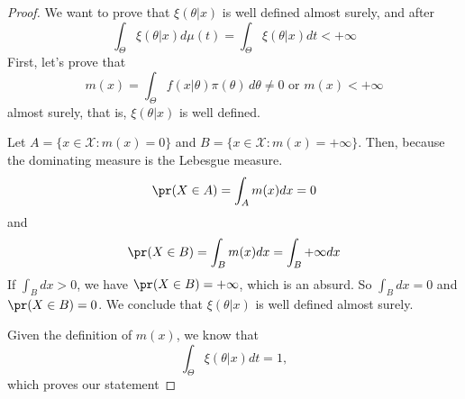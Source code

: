 \begin{proof}
    We want to prove that $\xi(\theta|x)$ is well defined almost
    surely, and after 
    $$
    \int_{\Theta } \xi(\theta|x) d\mu(t) = \int_{\Theta} \xi(\theta|x)dt < + \infty
    $$
    First, let's prove that 
    $$m(x) = \int_{\Theta} f(x|\theta)\pi(\theta) \, d\theta \neq 0 \text{ or } m(x) < + \infty$$ almost surely,
    that is, $\xi(\theta|x)$ is well defined. 
    
    Let $A = \{x \in \mathcal{X}: m(x) = 0\}$ and $B = \{x \in \mathcal{X}:
    m(x) = +\infty\}$. Then, because the dominating measure is the Lebesgue measure. 
    $$
    \pr(X \in A) = \int_A m(x) dx = 0
    $$
    and 
    $$
    \pr(X \in B) = \int_B m(x) dx = \int_B + \infty dx 
    $$
    If $\int_B dx > 0$, we have $\pr(X \in B) = + \infty$, which is an absurd.
    So $\int_B dx = 0$ and $\pr(X \in B) = 0$. We conclude that $\xi(\theta|x)$ is well
    defined almost surely. 

    Given the definition of $m(x)$, we know that
    $$
    \int_{\Theta} \xi(\theta|x)dt = 1,
    $$
    which proves our statement 
\end{proof}